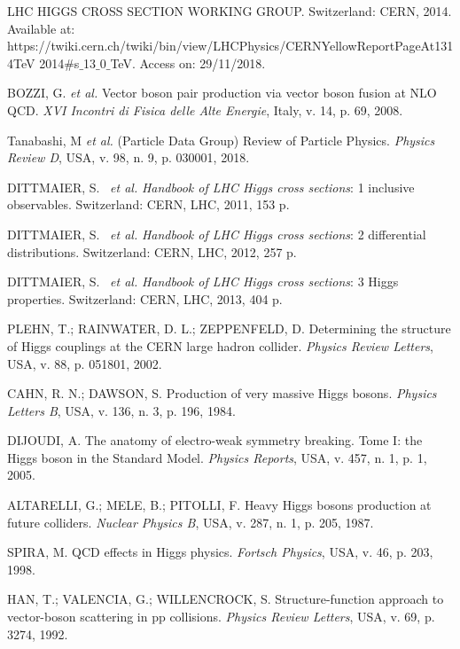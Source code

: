 \begin{thebibliography}{}
LHC HIGGS CROSS SECTION WORKING GROUP. Switzerland: CERN, 2014. Available at: https://twiki.cern.ch/twiki/bin/view/LHCPhysics/CERNYellowReportPageAt1314TeV 2014$\#$s$\_$13$\_$0$\_$TeV. Access on: 29/11/2018.

BOZZI, G. \textit{et al.} Vector boson pair production via vector boson fusion at NLO QCD. \textit{XVI Incontri di Fisica delle Alte Energie}, Italy, v. 14, p. 69, 2008.

Tanabashi, M \textit{et al.} (Particle Data Group) Review of Particle Physics. \textit{Physics Review D}, USA, v. 98, n. 9, p. 030001, 2018.

DITTMAIER, S. ~\textit{et al.} \textit{Handbook of LHC Higgs cross sections}: 1 inclusive observables. Switzerland: CERN, LHC, 2011, 153 p.

DITTMAIER, S. ~\textit{et al.} \textit{Handbook of LHC Higgs cross sections}: 2 differential distributions. Switzerland: CERN, LHC, 2012, 257 p.

DITTMAIER, S. ~\textit{et al.} \textit{Handbook of LHC Higgs cross sections}: 3 Higgs properties. Switzerland: CERN, LHC, 2013, 404 p.

PLEHN, T.; RAINWATER, D. L.; ZEPPENFELD, D. Determining the structure of Higgs couplings at the CERN large hadron collider. \textit{Physics Review Letters}, USA, v. 88, p. 051801, 2002.

CAHN, R. N.; DAWSON, S. Production of very massive Higgs bosons. \textit{Physics Letters B}, USA, v. 136, n. 3, p. 196, 1984.

DIJOUDI, A. The anatomy of electro-weak symmetry breaking. Tome I: the Higgs boson in the Standard Model. \textit{Physics Reports}, USA, v. 457, n. 1, p. 1, 2005.

ALTARELLI, G.; MELE, B.; PITOLLI, F. Heavy Higgs bosons production at future colliders. \textit{Nuclear Physics B}, USA, v. 287, n. 1, p. 205, 1987.

SPIRA, M. QCD effects in Higgs physics. \textit{Fortsch Physics}, USA, v. 46, p. 203, 1998.

HAN, T.; VALENCIA, G.; WILLENCROCK, S. Structure-function approach to vector-boson scattering in pp collisions. \textit{Physics Review Letters}, USA, v. 69, p. 3274, 1992.


\end{thebibliography}

